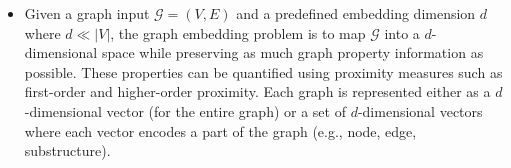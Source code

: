 \begin{itemize}
	\[
	\resizebox{\linewidth}{!}{$
	s^{(2)}_{12} = \cos(s^{(1)}_1, s^{(1)}_2) = 0.43, \quad s^{(2)}_{15} = \cos(s^{(1)}_1, s^{(1)}_5) = 0.
	$}
	\]
	
	We observe that the second-order proximity between \(v_1\) and \(v_5\) is 0 because they share no common 1-hop neighbors. \(v_1\) and \(v_2\) share a common neighbor \(v_3\), thus their second-order proximity \(s^{(2)}_{12}\) is greater than 0.
	
	Higher-order proximities can be defined similarly. For example, the \(k\)-th order proximity between \(v_i\) and \(v_j\) is the similarity between \(s^{(k-1)}_i\) and \(s^{(k-1)}_j\).
	
	\item
	\begin{definition}\label{def:graphEmbedding}
		Given a graph input \(\mathcal{G} = (V, E)\) and a predefined embedding dimension \(d\) where \(d \ll |V|\), the graph embedding problem is to map \(\mathcal{G}\) into a \(d\)-dimensional space while preserving as much graph property information as possible. These properties can be quantified using proximity measures such as first-order and higher-order proximity. Each graph is represented either as a \(d\)-dimensional vector (for the entire graph) or a set of \(d\)-dimensional vectors where each vector encodes a part of the graph (e.g., node, edge, substructure).
	\end{definition}
\end{itemize}



